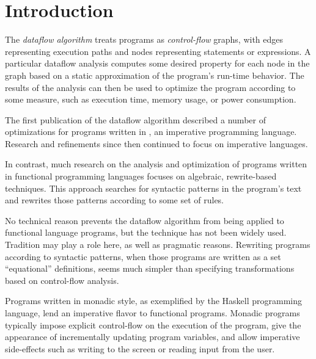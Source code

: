 \dodocclass



\chapter{Introduction}

The \emph{dataflow algorithm} treats programs as \emph{control-flow}
graphs, with edges representing execution paths and nodes representing
statements or expressions. A particular dataflow analysis computes
some desired property for each node in the graph based on a static
approximation of the program's run-time behavior. The results of the
analysis can then be used to optimize the program according to some
measure, such as execution time, memory usage, or power
consumption. 

The first publication of the dataflow algorithm \citep{Kildall1973}
described a number of optimizations for programs written in \algol, an
imperative programming language. Research and refinements since then
continued to focus on imperative languages.

 In
contrast, much research on the analysis and optimization of programs
written in functional programming languages focuses on algebraic,
rewrite-based techniques. This approach searches for syntactic
patterns in the program's text and rewrites those patterns according
to some set of rules.

No technical reason prevents the dataflow algorithm from being applied
to functional language programs, but the technique has not been widely
used. Tradition may play a role here, as well as pragmatic
reasons. Rewriting programs according to syntactic patterns, when
those programs are written as a set ``equational'' definitions, seems much
simpler than specifying transformations based on control-flow
analysis. 

Programs written in monadic style, as exemplified by the Haskell
programming language, lend an imperative flavor to functional
programs. Monadic programs typically impose explicit control-flow on
the execution of the program, give the appearance of incrementally
updating program variables, and allow imperative side-effects such as
writing to the screen or reading input from the user.

